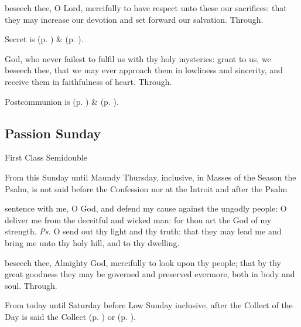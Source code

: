 \secret
{} beseech thee, O Lord, mercifully to have respect unto these our sacrifices: that they may increase our devotion and set forward our salvation. Through.
\begin{rubric}
     Secret is  (p. \pageref{SPSaints}) \&   (p. \pageref{SPLivingDeparted}).
\end{rubric}
\postcommunion
{} God, who never failest to fulfil us with thy holy mysteries: grant to us, we beseech thee, that we may ever approach them in lowliness and sincerity, and receive them in faithfulness of heart. Through.
\begin{rubric}
     Postcommunion is  (p. \pageref{SPSaints}) \&   (p. \pageref{SPLivingDeparted}).
\end{rubric}


\subsection{Passion Sunday}\label{PassionSunday}
\begin{inhead}
{First Class Semidouble}
\end{inhead}

\begin{rubric}
    From this Sunday until Maundy Thursday, inclusive, in Masses of the Season the Psalm,  is not said before the Confession nor  at the Introit and after the Psalm 
\end{rubric}

\introit
{} sentence with me, O God, and defend my cause against the ungodly people: O deliver me from the deceitful and wicked man: for thou art the God of my strength. \textit{Ps.} O send out thy light and thy truth: that they may lead me and bring me unto thy holy hill, and to thy dwelling.

\collect
{} beseech thee, Almighty God, mercifully to look upon thy people; that by thy great goodness they may be governed and preserved evermore, both in body and soul. Through.
\begin{rubric}
    From today until Saturday before Low Sunday inclusive, after the Collect of the Day is said the Collect  (p. \pageref{SPAgainst}) or  (p. \pageref{SPChiefBishop}).
\end{rubric}


